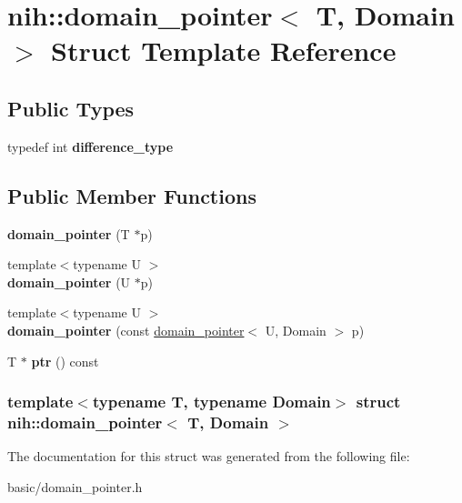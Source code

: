 \hypertarget{structnih_1_1domain__pointer}{
\section{nih\-:\-:domain\-\_\-pointer$<$ \-T, \-Domain $>$ \-Struct \-Template \-Reference}
\label{structnih_1_1domain__pointer}
}
\subsection*{\-Public \-Types}
\begin{DoxyCompactItemize}
\item 
\hypertarget{structnih_1_1domain__pointer_a2886fd1032087829835fdfd5a8e0e6a7}{
typedef int {\bfseries difference\-\_\-type}}
\label{structnih_1_1domain__pointer_a2886fd1032087829835fdfd5a8e0e6a7}

\end{DoxyCompactItemize}
\subsection*{\-Public \-Member \-Functions}
\begin{DoxyCompactItemize}
\item 
\hypertarget{structnih_1_1domain__pointer_a5490cf9cba5f287182acc9c3f9080aff}{
{\bfseries domain\-\_\-pointer} (\-T $\ast$p)}
\label{structnih_1_1domain__pointer_a5490cf9cba5f287182acc9c3f9080aff}

\item 
\hypertarget{structnih_1_1domain__pointer_a275e7bbac9febf79f36ab89091d5e2db}{
{\footnotesize template$<$typename U $>$ }\\{\bfseries domain\-\_\-pointer} (\-U $\ast$p)}
\label{structnih_1_1domain__pointer_a275e7bbac9febf79f36ab89091d5e2db}

\item 
\hypertarget{structnih_1_1domain__pointer_a93b07dd4561312ee8bd8540578913136}{
{\footnotesize template$<$typename U $>$ }\\{\bfseries domain\-\_\-pointer} (const \hyperlink{structnih_1_1domain__pointer}{domain\-\_\-pointer}$<$ \-U, \-Domain $>$ p)}
\label{structnih_1_1domain__pointer_a93b07dd4561312ee8bd8540578913136}

\item 
\hypertarget{structnih_1_1domain__pointer_aebf3be648df1672e75d8b0f33b7236ac}{
\-T $\ast$ {\bfseries ptr} () const }
\label{structnih_1_1domain__pointer_aebf3be648df1672e75d8b0f33b7236ac}

\end{DoxyCompactItemize}
\subsubsection*{template$<$typename \-T, typename \-Domain$>$ struct nih\-::domain\-\_\-pointer$<$ T, Domain $>$}



\-The documentation for this struct was generated from the following file\-:\begin{DoxyCompactItemize}
\item 
basic/domain\-\_\-pointer.\-h\end{DoxyCompactItemize}

